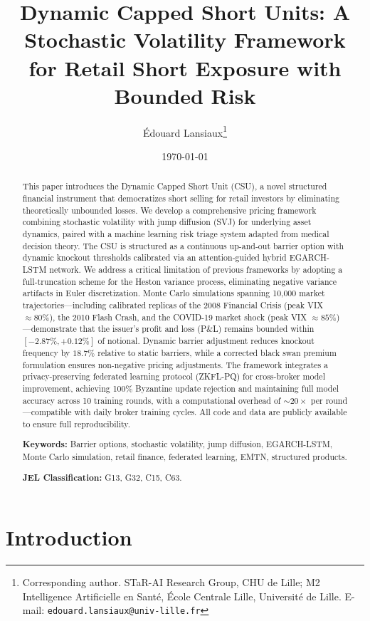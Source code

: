 \documentclass[12pt]{article}
\title{Dynamic Capped Short Units: A Stochastic Volatility Framework\\
for Retail Short Exposure with Bounded Risk}
\author{%
    \'{E}douard Lansiaux\thanks{Corresponding author.
    STaR-AI Research Group, CHU de Lille; M2 Intelligence Artificielle en Sant\'{e},
    \'{E}cole Centrale Lille, Universit\'{e} de Lille. E-mail: \texttt{edouard.lansiaux@univ-lille.fr}}
}
\date{\today}
\begin{document}
\maketitle

\begin{abstract}
This paper introduces the Dynamic Capped Short Unit (CSU), a novel structured financial
instrument that democratizes short selling for retail investors by eliminating theoretically
unbounded losses. We develop a comprehensive pricing framework combining stochastic volatility
with jump diffusion (SVJ) for underlying asset dynamics, paired with a machine learning risk
triage system adapted from medical decision theory. The CSU is structured as a continuous
up-and-out barrier option with dynamic knockout thresholds calibrated via an attention-guided
hybrid EGARCH-LSTM network. We address a critical limitation of previous frameworks by adopting
a full-truncation scheme for the Heston variance process, eliminating negative variance artifacts
in Euler discretization. Monte Carlo simulations spanning 10,000 market trajectories---including
calibrated replicas of the 2008 Financial Crisis (peak VIX $\approx 80\%$), the 2010 Flash Crash,
and the COVID-19 market shock (peak VIX $\approx 85\%$)---demonstrate that the issuer's profit and
loss (P\&L) remains bounded within $[-2.87\%, +0.12\%]$ of notional. Dynamic barrier adjustment
reduces knockout frequency by $18.7\%$ relative to static barriers, while a corrected black swan
premium formulation ensures non-negative pricing adjustments. The framework integrates a
privacy-preserving federated learning protocol (ZKFL-PQ) for cross-broker model improvement,
achieving 100\% Byzantine update rejection and maintaining full model accuracy across 10 training
rounds, with a computational overhead of ${\sim}20\times$ per round---compatible with daily
broker training cycles. All code and data are publicly available to ensure full reproducibility.

\textbf{Keywords:} Barrier options, stochastic volatility, jump diffusion, EGARCH-LSTM,
Monte Carlo simulation, retail finance, federated learning, EMTN, structured products.

\textbf{JEL Classification:} G13, G32, C15, C63.
\end{abstract}

\section{Introduction}
\end{document}
